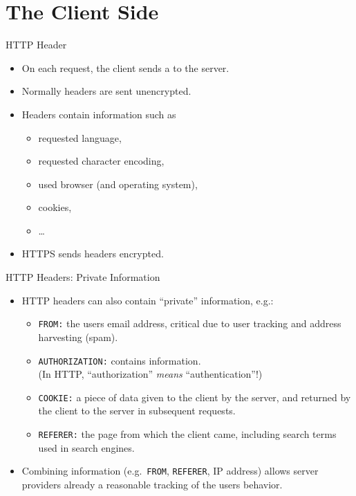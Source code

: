 \documentclass{beamer}
\begin{document}
\section{The Client Side}
\begin{slide}{HTTP Header}
  \begin{itemize}\itemsep=1ex
    \item On each request, the client sends a  to the 
          server.
    \item Normally headers are sent unencrypted.
    \item Headers contain information such as
    \begin{itemize}
      \item requested language,
      \item requested character encoding,
      \item used browser (and operating system),
      \item cookies,       
      \item \ldots
    \end{itemize}
    \item HTTPS sends headers encrypted.
  \end{itemize}
\end{slide}
\begin{slide}{HTTP Headers: Private Information}
\begin{itemize}\itemsep=2ex
\item HTTP headers can also contain ``private'' information, e.g.:
  \begin{itemize}\itemsep=1.5ex
  \item \texttt{FROM:} the users email address, critical due to user
    tracking and address harvesting (spam).
  \item \texttt{AUTHORIZATION:} contains 
    information.\\
    (In HTTP, ``authorization'' \emph{means} ``authentication''!)
  \item \texttt{COOKIE:} a piece of data given to the client by the
    server, and returned by the client to the server in subsequent
    requests.
  \item \texttt{REFERER:} the page from which the client came,
    including search terms used in search engines.
  \end{itemize}
\item Combining information (e.g.\ \texttt{FROM}, \texttt{REFERER}, IP
  address) allows server providers already a reasonable tracking of
  the users behavior.
\end{itemize}
\end{slide}
\end{document}
